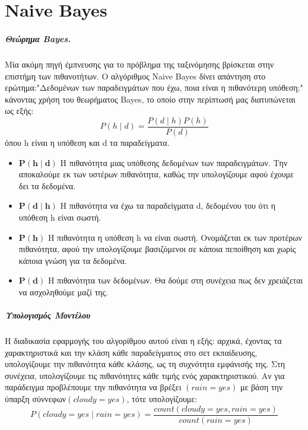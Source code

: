 \chapter{Naive Bayes}
\label{appendix:NBayes}
\paragraph{Θεώρημα Bayes.} Μία ακόμη πηγή έμπνευσης για το πρόβλημα της ταξινόμησης βρίσκεται στην επιστήμη των πιθανοτήτων. Ο αλγόριθμος Naive Bayes δίνει απάντηση στο ερώτημα:"Δεδομένων των
παραδειγμάτων που έχω, ποια είναι η πιθανότερη υπόθεση;" κάνοντας χρήση του θεωρήματος Bayes, το οποίο στην περίπτωσή μας διατυπώνεται ως εξής: 
\begin{equation}
P(h \mid d)= \frac{P(d \mid h) P(h)}{P(d)}
\end{equation}
όπου h είναι η υπόθεση και d τα παραδείγματα.

\begin{itemize}
	\item $\bm{P(h \mid d)}$ Η πιθανότητα μιας υπόθεσης δεδομένων των παραδειγμάτων. Την αποκαλούμε εκ των υστέρων πιθανότητα, καθώς την υπολογίζουμε αφού έχουμε δει τα δεδομένα.
	\item $\bm{P(d \mid h)}$ Η πιθανότητα να έχω τα παραδείγματα d, δεδομένου του ότι η υπόθεση h είναι σωστή.
	\item $\bm{P( h)}$ Η πιθανότητα η υπόθεση h να είναι σωστή. Ονομάζεται εκ των προτέρων πιθανότητα, αφού την υπολογίζουμε βασιζόμενοι σε κάποια πεποίθηση και χωρίς κάποια γνώση για τα δεδομένα.
	\item $\bm{P(d)}$ Η πιθανότητα των δεδομένων. Θα δούμε στη συνέχεια πως δεν χρειάζεται να ασχοληθούμε μαζί της.
\end{itemize}
\paragraph{Υπολογισμός Μοντέλου} Η διαδικασία εφαρμογής του αλγορίθμου αυτού είναι η εξής: αρχικά, έχοντας τα χαρακτηριστικά και την κλάση κάθε παραδείγματος στο σετ εκπαίδευσης, υπολογίζουμε την πιθανότητα κάθε κλάσης, ως τη συχνότητα εμφάνισής της. Στη συνέχεια, υπολογίζουμε τις πιθανότητες κάθε τιμής ενός χαρακτηριστικού. Αν για παράδειγμα προβλέπουμε την πιθανότητα να βρέξει $(rain=yes)$ με βάση την ύπαρξη σύννεφων$(cloudy=yes)$, τότε υπολογίζουμε:
\begin{equation}
P(cloudy= yes \mid rain=yes)= \frac{count(cloudy=yes, rain =yes)}{count(rain=yes)}
\end{equation}
